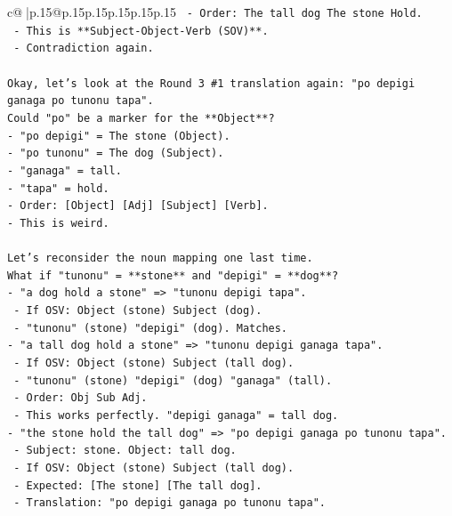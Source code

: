 \documentclass{article}
\begin{document}
{\begin{supertabular}{c@{$\;$}|p{.15\linewidth}@{}p{.15\linewidth}p{.15\linewidth}p{.15\linewidth}p{.15\linewidth}p{.15\linewidth}}
{{{\texttt{    {-} Order: The tall dog The stone Hold.} \\
\texttt{    {-} This is **Subject{-}Object{-}Verb (SOV)**.} \\
\texttt{    {-} Contradiction again.} \\
\\ 
\texttt{Okay, let's look at the Round 3 \#1 translation again: "po depigi ganaga po tunonu tapa".} \\
\texttt{Could "po" be a marker for the **Object**?} \\
\texttt{{-} "po depigi" = The stone (Object).} \\
\texttt{{-} "po tunonu" = The dog (Subject).} \\
\texttt{{-} "ganaga" = tall.} \\
\texttt{{-} "tapa" = hold.} \\
\texttt{{-} Order: {[}Object{]} {[}Adj{]} {[}Subject{]} {[}Verb{]}.} \\
\texttt{{-} This is weird.} \\
\\ 
\texttt{Let's reconsider the noun mapping one last time.} \\
\texttt{What if "tunonu" = **stone** and "depigi" = **dog**?} \\
\texttt{{-} "a dog hold a stone" => "tunonu depigi tapa".} \\
\texttt{  {-} If OSV: Object (stone) Subject (dog).} \\
\texttt{  {-} "tunonu" (stone) "depigi" (dog). Matches.} \\
\texttt{{-} "a tall dog hold a stone" => "tunonu depigi ganaga tapa".} \\
\texttt{  {-} If OSV: Object (stone) Subject (tall dog).} \\
\texttt{  {-} "tunonu" (stone) "depigi" (dog) "ganaga" (tall).} \\
\texttt{  {-} Order: Obj Sub Adj.} \\
\texttt{  {-} This works perfectly. "depigi ganaga" = tall dog.} \\
\texttt{{-} "the stone hold the tall dog" => "po depigi ganaga po tunonu tapa".} \\
\texttt{  {-} Subject: stone. Object: tall dog.} \\
\texttt{  {-} If OSV: Object (stone) Subject (tall dog).} \\
\texttt{  {-} Expected: {[}The stone{]} {[}The tall dog{]}.} \\
\texttt{  {-} Translation: "po depigi ganaga po tunonu tapa".} \\
}}}
\end{supertabular}}
\end{document}
